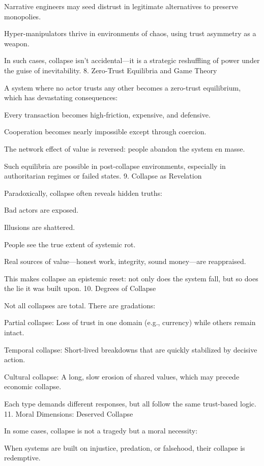 \documentclass[11pt,oneside]{book}
\begin{document}
    Narrative engineers may seed distrust in legitimate alternatives to preserve monopolies.

    Hyper-manipulators thrive in environments of chaos, using trust asymmetry as a weapon.

In such cases, collapse isn’t accidental—it is a strategic reshuffling of power under the guise of inevitability.
8. Zero-Trust Equilibria and Game Theory

A system where no actor trusts any other becomes a zero-trust equilibrium, which has devastating consequences:

    Every transaction becomes high-friction, expensive, and defensive.

    Cooperation becomes nearly impossible except through coercion.

    The network effect of value is reversed: people abandon the system en masse.

Such equilibria are possible in post-collapse environments, especially in authoritarian regimes or failed states.
9. Collapse as Revelation

Paradoxically, collapse often reveals hidden truths:

    Bad actors are exposed.

    Illusions are shattered.

    People see the true extent of systemic rot.

    Real sources of value—honest work, integrity, sound money—are reappraised.

This makes collapse an epistemic reset: not only does the system fall, but so does the lie it was built upon.
10. Degrees of Collapse

Not all collapses are total. There are gradations:

    Partial collapse: Loss of trust in one domain (e.g., currency) while others remain intact.

    Temporal collapse: Short-lived breakdowns that are quickly stabilized by decisive action.

    Cultural collapse: A long, slow erosion of shared values, which may precede economic collapse.

Each type demands different responses, but all follow the same trust-based logic.
11. Moral Dimensions: Deserved Collapse

In some cases, collapse is not a tragedy but a moral necessity:

    When systems are built on injustice, predation, or falsehood, their collapse is redemptive.
\end{document}
